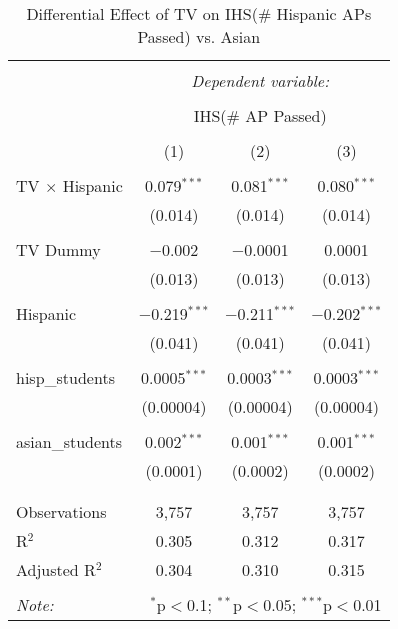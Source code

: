 
\begin{table}[!htbp] \centering 
  \caption{Differential Effect of TV on IHS(\# Hispanic APs Passed) vs. Asian} 
  \label{} 
\begin{tabular}{@{\extracolsep{-2pt}}lccc} 
\\[-1.8ex]\hline 
\hline \\[-1.8ex] 
 & \multicolumn{3}{c}{\textit{Dependent variable:}} \\ 
\cline{2-4} 
\\[-1.8ex] & \multicolumn{3}{c}{IHS(\# AP Passed)} \\ 
\\[-1.8ex] & (1) & (2) & (3)\\ 
\hline \\[-1.8ex] 
 TV $\times$ Hispanic & 0.079$^{***}$ & 0.081$^{***}$ & 0.080$^{***}$ \\ 
  & (0.014) & (0.014) & (0.014) \\ 
  & & & \\ 
 TV Dummy & $-$0.002 & $-$0.0001 & 0.0001 \\ 
  & (0.013) & (0.013) & (0.013) \\ 
  & & & \\ 
 Hispanic & $-$0.219$^{***}$ & $-$0.211$^{***}$ & $-$0.202$^{***}$ \\ 
  & (0.041) & (0.041) & (0.041) \\ 
  & & & \\ 
 hisp\_students & 0.0005$^{***}$ & 0.0003$^{***}$ & 0.0003$^{***}$ \\ 
  & (0.00004) & (0.00004) & (0.00004) \\ 
  & & & \\ 
 asian\_students & 0.002$^{***}$ & 0.001$^{***}$ & 0.001$^{***}$ \\ 
  & (0.0001) & (0.0002) & (0.0002) \\ 
  & & & \\ 
\hline \\[-1.8ex] 
Observations & 3,757 & 3,757 & 3,757 \\ 
R$^{2}$ & 0.305 & 0.312 & 0.317 \\ 
Adjusted R$^{2}$ & 0.304 & 0.310 & 0.315 \\ 
\hline 
\hline \\[-1.8ex] 
\textit{Note:}  & \multicolumn{3}{r}{$^{*}$p$<$0.1; $^{**}$p$<$0.05; $^{***}$p$<$0.01} \\ 
\end{tabular} 
\end{table} 
